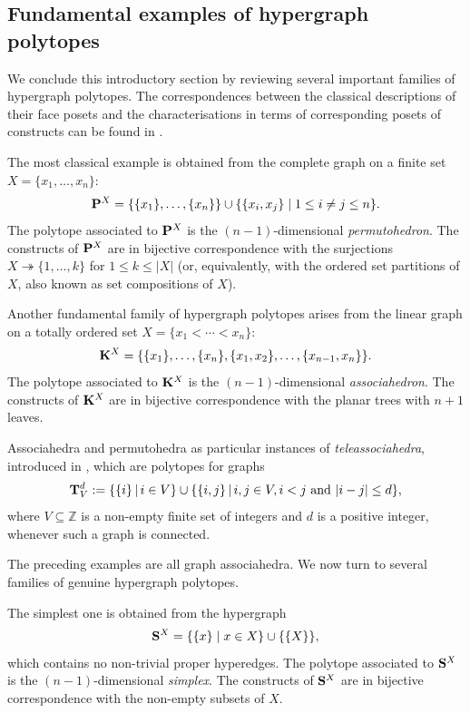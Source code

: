 \documentclass{article}
\theoremstyle{plain}
\theoremstyle{definition}
\newcommand{\inc}{\subseteq}
\newcommand{\union}{\cup}
\newcommand{\set}[1]{\{#1\}}
\newcommand{\setc}[2]{\set{#1 \mid #2}}
\newcommand{\hyper}[1]{{\bf #1}}
\begin{document}
\subsection{Fundamental examples of hypergraph polytopes} \label{fundamental-examples-section}
 We conclude this introductory section by reviewing several important families of hypergraph polytopes. The correspondences between the classical descriptions of their face posets and the characterisations in terms of corresponding posets of constructs can be found in \cite[Section 2.4]{COI}. 

 
\smallskip
The most classical example is obtained from the complete graph on a finite set $X=\set{x_1,\ldots,x_n}$: 
$$\hyper{P}^X= \set{\set{x_1},\ldots,\set{x_n}} \cup \setc{\set{x_i,x_j}}{1\leq i\neq j\leq n}.$$
The polytope associated to $\hyper{P}^X$ is the $(n-1)$-dimensional {\em permutohedron}. The constructs of $\hyper{P}^X$ are in bijective correspondence with the surjections $X \twoheadrightarrow \{1,\ldots,k\}$ for 
$1 \leq k \leq |X|$ (or, equivalently, with the ordered set partitions of $X$, also known as set compositions of $X$).

\smallskip
Another fundamental family of hypergraph polytopes arises from the linear graph on a totally ordered set $X=\{x_1<\cdots <x_n\}$: 
$${\bf K}^{X}=\{\{x_1\},\dots,\{x_n\},\{x_1,x_2\},\dots,\{x_{n-1},x_n\}\}.$$
The polytope associated to $\hyper{K}^X$ is the $(n-1)$-dimensional {\em associahedron}. The constructs of ${\bf K}^{X}$ are in bijective correspondence with the planar trees with $n+1$ leaves.

\smallskip 
Associahedra and permutohedra as particular instances of
 {\em teleassociahedra}, introduced in \cite[Example 4.3]{PLBJ2}, which are polytopes for graphs $$\hyper{T}^d_V:=\{\{i\}\,|\, i \in V\} \cup \{\{i,j\}\,|\, i,j \in V, i < j \mbox{ and } |i-j| \leq d\},$$ where $V\inc\mathbb{Z}$ is a non-empty finite set of integers and $d$ is a positive integer, whenever such a graph is connected. 
 
 \medskip
 The preceding examples are all graph associahedra. We now turn to several families of genuine hypergraph polytopes.

\smallskip

The simplest one is obtained from the hypergraph
$$\hyper{S}^X=\setc{\set{x}}{x\in X}\union\set{\set{X}},$$
which contains no non-trivial proper hyperedges. The polytope associated to $\hyper{S}^X$ is the $(n-1)$-dimensional {\em simplex}. 
The constructs of $\hyper{S}^X$ are in bijective correspondence with the non-empty subsets of $X$. 
\end{document}
